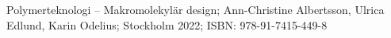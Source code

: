 \begin{thebibliography}{0}
    Polymerteknologi -- Makromolekylär design; Ann-Christine Albertsson, Ulrica Edlund, Karin Odelius; Stockholm 2022; ISBN: 978-91-7415-449-8
\end{thebibliography}